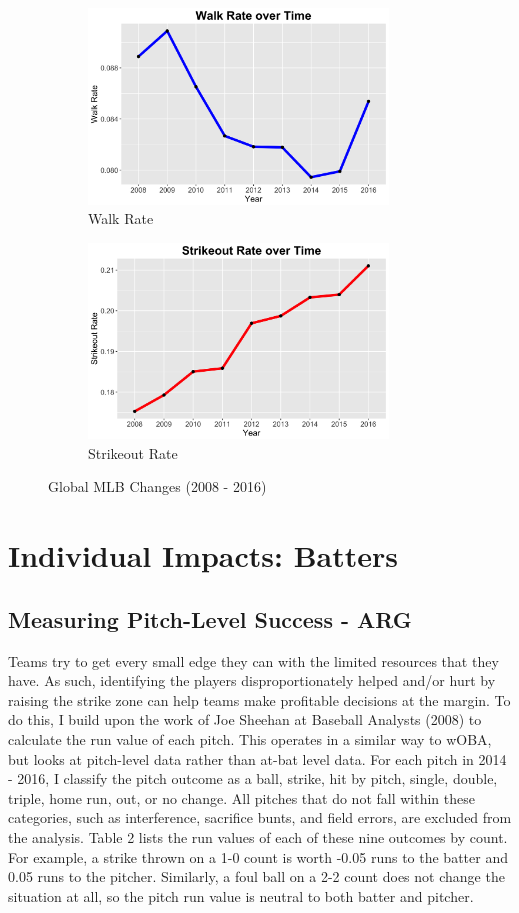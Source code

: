 \documentclass[11pt]{article}
\begin{document}
\begin{figure}[ht]
\centering
\begin{subfigure}[b]{0.48\textwidth}
\centering
\includegraphics[height = 5.2cm]{../Output/fig5a.png}
\caption{Walk Rate}
\end{subfigure}
\begin{subfigure}[b]{0.48\textwidth}
\centering
\includegraphics[height = 5.2cm]{../Output/fig5b.png}
\caption{Strikeout Rate}
\end{subfigure}
\caption{Global MLB Changes (2008 - 2016)}
\end{figure}

\section{Individual Impacts: Batters}

\subsection{Measuring Pitch-Level Success - ARG}
Teams try to get every small edge they can with the limited resources that they have.  As such, identifying the players disproportionately helped and/or hurt by raising the strike zone can help teams make profitable decisions at the margin.  To do this, I build upon the work of Joe Sheehan at Baseball Analysts (2008) to calculate the run value of each pitch.  This operates in a similar way to wOBA, but looks at pitch-level data rather than at-bat level data.  For each pitch in 2014 - 2016, I classify the pitch outcome as a ball, strike, hit by pitch, single, double, triple, home run, out, or no change.  All pitches that do not fall within these categories, such as interference, sacrifice bunts, and field errors, are excluded from the analysis.  Table 2 lists the run values of each of these nine outcomes by count.  For example, a strike thrown on a 1-0 count is worth -0.05 runs to the batter and 0.05 runs to the pitcher.  Similarly, a foul ball on a 2-2 count does not change the situation at all, so the pitch run value is neutral to both batter and pitcher.\\  
\newpage
\end{document}
